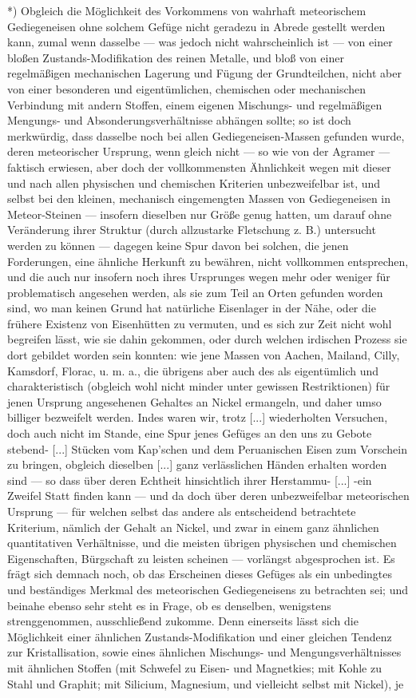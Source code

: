 \documentclass[a4paper, 11pt, oneside, german]{article}
\begin{document}
*) Obgleich die Möglichkeit des Vorkommens von wahrhaft meteorischem Gediegeneisen ohne solchem Gefüge nicht geradezu in Abrede gestellt werden kann, zumal wenn dasselbe --- was jedoch nicht wahrscheinlich ist --- von einer bloßen Zustands-Modifikation des reinen Metalle, und bloß von einer regelmäßigen mechanischen Lagerung und Fügung der Grundteilchen, nicht aber von einer besonderen und eigentümlichen, chemischen oder mechanischen Verbindung mit andern Stoffen, einem eigenen Mischungs- und regelmäßigen Mengungs- und Absonderungsverhältnisse abhängen sollte; so ist doch merkwürdig, dass dasselbe noch bei allen Gediegeneisen-Massen gefunden wurde, deren meteorischer Ursprung, wenn gleich nicht --- so wie von der Agramer --- faktisch erwiesen, aber doch der vollkommensten Ähnlichkeit wegen mit dieser und nach allen physischen und chemischen Kriterien unbezweifelbar ist, und selbst bei den kleinen, mechanisch eingemengten Massen von Gediegeneisen in Meteor-Steinen --- insofern dieselben nur Größe genug hatten, um darauf ohne Veränderung ihrer Struktur (durch allzustarke Fletschung z. B.) untersucht werden zu können --- dagegen keine Spur davon bei solchen, die jenen Forderungen, eine ähnliche Herkunft zu bewähren, nicht vollkommen entsprechen, und die auch nur insofern noch ihres Ursprunges wegen mehr oder weniger für problematisch angesehen werden, als sie zum Teil an Orten gefunden worden sind, wo man keinen Grund hat natürliche Eisenlager in der Nähe, oder die frühere Existenz von Eisenhütten zu vermuten, und es sich zur Zeit nicht wohl begreifen lässt, wie sie dahin gekommen, oder durch welchen irdischen Prozess sie dort gebildet worden sein konnten: wie jene Massen von Aachen, Mailand, Cilly, Kamsdorf, Florac, u. m. a., die übrigens aber auch des als eigentümlich und charakteristisch (obgleich wohl nicht minder unter gewissen Restriktionen) für jenen Ursprung angesehenen Gehaltes an Nickel ermangeln, und daher umso billiger bezweifelt werden. Indes waren wir, trotz [...] wiederholten Versuchen, doch auch nicht im Stande, eine Spur jenes Gefüges an den uns zu Gebote stebend- [...] Stücken vom Kap'schen und dem Peruanischen Eisen zum Vorschein zu bringen, obgleich dieselben [...] ganz verlässlichen Händen erhalten worden sind --- so dass über deren Echtheit hinsichtlich ihrer Herstammu- [...] -ein Zweifel Statt finden kann --- und da doch über deren unbezweifelbar meteorischen Ursprung --- für welchen selbst das andere als entscheidend betrachtete Kriterium, nämlich der Gehalt an Nickel, und zwar in einem ganz ähnlichen quantitativen Verhältnisse, und die meisten übrigen physischen und chemischen Eigenschaften, Bürgschaft zu leisten scheinen --- vorlängst abgesprochen ist. Es frägt sich demnach noch, ob das Erscheinen dieses Gefüges als ein unbedingtes und beständiges Merkmal des meteorischen Gediegeneisens zu betrachten sei; und beinahe ebenso sehr steht es in Frage, ob es denselben, wenigstens strenggenommen, ausschließend zukomme. Denn einerseits lässt sich die Möglichkeit einer ähnlichen Zustands-Modifikation und einer gleichen Tendenz zur Kristallisation, sowie eines ähnlichen Mischungs- und Mengungsverhältnisses mit ähnlichen Stoffen (mit Schwefel zu Eisen- und Magnetkies; mit Kohle zu Stahl und Graphit; mit Silicium, Magnesium, und vielleicht selbst mit Nickel), je 
\end{document}
